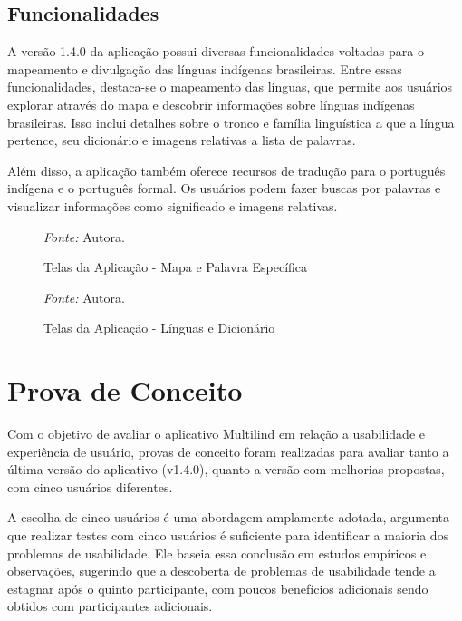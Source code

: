 \subsection{Funcionalidades}
\label{Funcionalidades}
A versão 1.4.0 da aplicação possui diversas funcionalidades voltadas para o mapeamento e divulgação das línguas indígenas brasileiras. Entre essas funcionalidades, destaca-se o mapeamento das línguas, que permite aos usuários 
explorar através do mapa e descobrir informações sobre línguas indígenas brasileiras. Isso inclui detalhes sobre o tronco e família linguística a que a língua pertence, seu dicionário e imagens relativas a lista de palavras.

Além disso, a aplicação também oferece recursos de tradução para o português indígena e o português formal. Os usuários podem fazer buscas por palavras e visualizar informações como significado e imagens relativas.

\begin{figure}[h!]
	\centering
	\caption{Telas da Aplicação - Mapa e Palavra Específica}
	\begin{tablenotes}[flushleft]
		\centering
		\item \textit{Fonte:} Autora.
	\end{tablenotes}
	\label{fig18}
\end{figure}

\begin{figure}[h!]
	\centering
	\caption{Telas da Aplicação - Línguas e Dicionário}
	\begin{tablenotes}[flushleft]
		\centering
		\item \textit{Fonte:} Autora.
	\end{tablenotes}
	\label{fig19}
\end{figure}


\section{Prova de Conceito}
\label{sec:Prova de Conceito}
Com o objetivo de avaliar o aplicativo Multilind em relação a usabilidade e experiência de usuário, provas de conceito foram 
realizadas para avaliar tanto a última versão do aplicativo (v1.4.0), quanto a versão com melhorias propostas, com cinco usuários diferentes.

A escolha de cinco usuários é uma abordagem amplamente adotada,  argumenta que realizar testes com cinco usuários é suficiente para identificar a maioria dos problemas de 
usabilidade. Ele baseia essa conclusão em estudos empíricos e observações, sugerindo que a descoberta de problemas de usabilidade tende a estagnar após o quinto participante, com poucos benefícios 
adicionais sendo obtidos com participantes adicionais.

